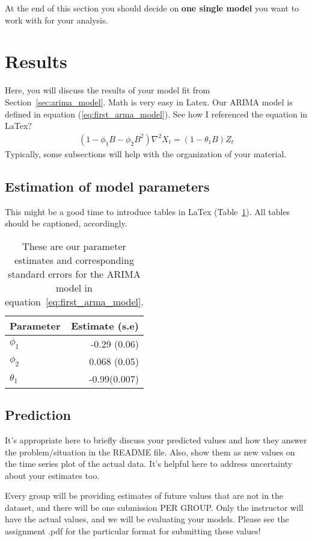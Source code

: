 \documentclass[a4paper]{article}
\begin{document}
At the end of this section you should decide on \textbf{one single model} you want to work with for your analysis. 

\section{Results}\label{sec:results}
Here, you will discuss the results of your model fit from
Section~\ref{sec:arima_model}. 
%
Math is very easy in Latex. Our ARIMA model is defined in equation (\ref{eq:first_arma_model}). See how I referenced the equation in LaTex?
\begin{align}
	(1 - \phi_1 B - \phi_2B^2) \nabla^2 X_t = (1 - \theta_1 B)Z_t
	\label{eq:first_arma_model}
\end{align}
Typically, some subsections will help with the organization of your material.
%
\subsection{Estimation of model parameters }
This might be a good time to introduce tables
in LaTex (Table~\ref{tab:param_est}).
All tables should be captioned, accordingly.

\begin{table}[h!]
	\centering
	\begin{tabular}{l|r}
	  Parameter & Estimate (s.e) \\ \hline
	  $\phi_1$& -0.29 (0.06) \\
	  $\phi_2$ & 0.068 (0.05) \\
		$\theta_1$ & -0.99(0.007)
	\end{tabular}
	\caption{These are our parameter estimates and corresponding standard errors
	for the ARIMA model in
	equation~\ref{eq:first_arma_model}. }
	\label{tab:param_est}
\end{table}

\newpage %

\subsection{Prediction}
It's appropriate here to briefly discuss your predicted values and how they answer the problem/situation in the README file. Also, show them as new values on the time series plot of the actual data. It's helpful here to address uncertainty about your estimates too. 

Every group will be providing estimates of future values that are not in the dataset, and there will be one submission PER GROUP.
Only the instructor will have the actual values, and we will be evaluating your models. Please see the assignment .pdf for the particular format for submitting these values!
\end{document}
